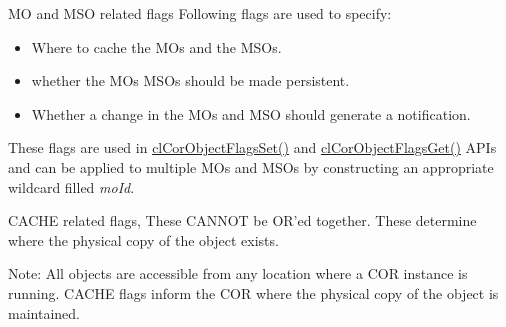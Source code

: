 MO and MSO related flags Following flags are used to specify: \begin{itemize}
\item Where to cache the MOs and the MSOs. \item whether the MOs MSOs should be made persistent. \item Whether a change in the MOs and MSO should generate a notification.\end{itemize}
These flags are used in \hyperlink{cl_cor_api_8h_a26}{cl\-Cor\-Object\-Flags\-Set()} and \hyperlink{cl_cor_api_8h_a27}{cl\-Cor\-Object\-Flags\-Get()} APIs and can be applied to multiple MOs and MSOs by constructing an appropriate wildcard filled {\em mo\-Id\/}.

CACHE related flags, These CANNOT be OR'ed together. These determine where the physical copy of the object exists. \begin{Desc}
\item[Note:]All objects are accessible from any location where a COR instance is running. CACHE flags inform the COR where the physical copy of the object is maintained. \end{Desc}
